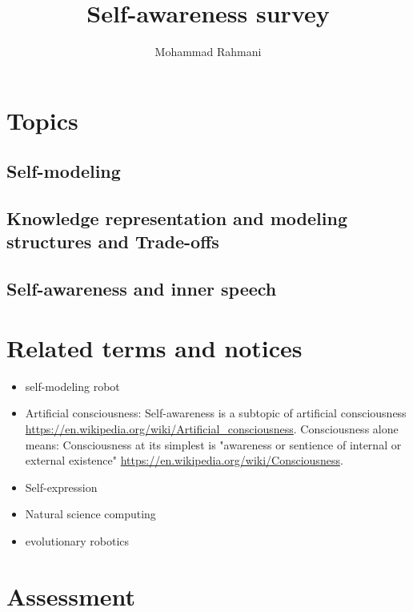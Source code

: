 \documentclass{article}
\begin{document}
	
	\title{Self-awareness survey}
	\author{Mohammad Rahmani}
	\date{}
	\maketitle
	
	\section{Topics}
		\subsection{Self-modeling}
			\citet{bellman-2017-self-modeling-and-self-awareness}
		\subsection{Knowledge representation and modeling structures and Trade-offs}
		\cite{minku-2016-knowledge-representation-and-modelling-structures-and-trade-offs}
		\subsection{Self-awareness and inner speech}
		\cite{chella-2020-developing-self-awareness-in-robots-via-inner-speech}
	\section{Related terms and notices}
		\begin{itemize}
			\item self-modeling robot \citep{kwiatkowski-2019-task-agnostic-self-modeling-machines}
			\item Artificial consciousness: Self-awareness is a subtopic of artificial consciousness \url{https://en.wikipedia.org/wiki/Artificial_consciousness}. Consciousness alone means: Consciousness at its simplest is "awareness or sentience of internal or external existence" \url{https://en.wikipedia.org/wiki/Consciousness}.
			\item Self-expression \citep{lewis-2011-a-survey-of-self-awareness-and-its-application-in-computing-systems}
			\item Natural science computing
			\item evolutionary robotics
		\end{itemize}
	
	\section{Assessment}
		\citet{herbst-2017-metrics-and-benchmarks-for-self-aware-computing-systems}
		\citet{esterle-2017-assessing-self-awareness}
\end{document}
